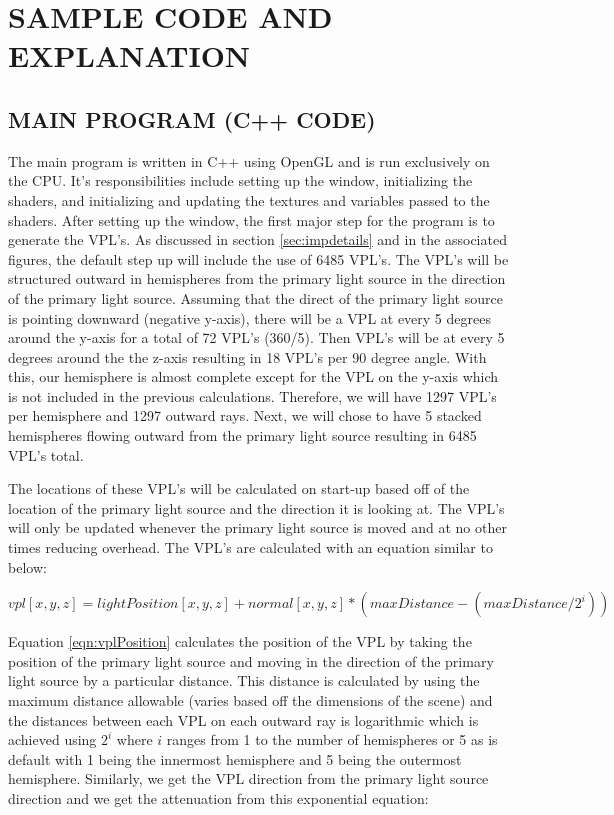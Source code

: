 \chapter{SAMPLE CODE AND EXPLANATION}

\section{MAIN PROGRAM (C++ CODE)}

The main program is written in C++ using OpenGL and is run exclusively on the CPU.  It's responsibilities include setting up the window, initializing the shaders, and initializing and updating the textures and variables passed to the shaders.  After setting up the window, the first major step for the program is to generate the VPL's.  As discussed in section \ref{sec:impdetails} and in the associated figures, the default step up will include the use of 6485 VPL's.  The VPL's will be structured outward in hemispheres from the primary light source in the direction of the primary light source.  Assuming that the direct of the primary light source is pointing downward (negative y-axis), there will be a VPL at every 5 degrees around the y-axis for a total of 72 VPL's (360/5).  Then VPL's will be at every 5 degrees around the the z-axis resulting in 18 VPL's per 90 degree angle.  With this, our hemisphere is almost complete except for the VPL on the y-axis which is not included in the previous calculations. Therefore, we will have 1297 VPL's per hemisphere and 1297 outward rays.  Next, we will chose to have 5 stacked hemispheres flowing outward from the primary light source resulting in 6485 VPL's total.  

The locations of these VPL's will be calculated on start-up based off of the location of the primary light source and the direction it is looking at.  The VPL's will only be updated whenever the primary light source is moved and at no other times reducing overhead.  The VPL's are calculated with an equation similar to below:

\begin{equation}
vpl[x,y,z] = lightPosition[x,y,z] + normal[x,y,z]*(maxDistance - (maxDistance/2^i)) \label{eqn:vplPosition}
\end{equation}

Equation \ref{eqn:vplPosition} calculates the position of the VPL by taking the position of the primary light source and moving in the direction of the primary light source by a particular distance.  This distance is calculated by using the maximum distance allowable (varies based off the dimensions of the scene) and the distances between each VPL on each outward ray is logarithmic which is achieved using $2^i$ where $i$ ranges from 1 to the number of hemispheres or 5 as is default with 1 being the innermost hemisphere and 5 being the outermost hemisphere.  Similarly, we get the VPL direction from the primary light source direction and we get the attenuation from this exponential equation:

